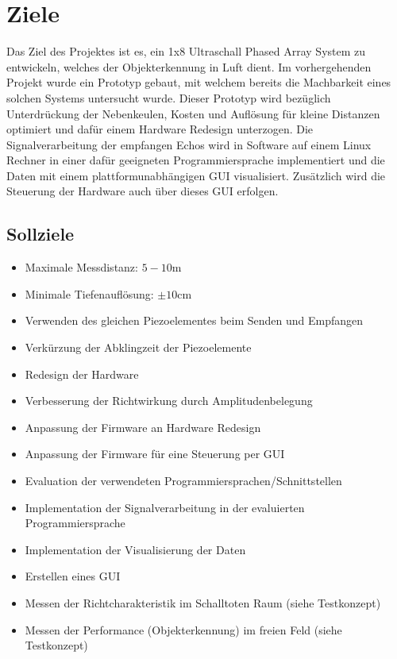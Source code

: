 \documentclass[10pt,a4paper,oneside]{99_fhnwreport}
\begin{document}
\clearpage

\section{Ziele}\label{sec:ziele}
Das Ziel des Projektes ist es, ein 1x8 Ultraschall Phased Array System zu entwickeln, welches der Objekterkennung in Luft dient. Im vorhergehenden Projekt wurde ein Prototyp gebaut, mit welchem bereits die Machbarkeit eines solchen Systems untersucht wurde. Dieser Prototyp wird bezüglich Unterdrückung der Nebenkeulen, Kosten und Auflösung für kleine Distanzen optimiert und dafür einem Hardware Redesign unterzogen. Die Signalverarbeitung der empfangen Echos wird in Software auf einem Linux Rechner in einer dafür geeigneten Programmiersprache implementiert und die Daten mit einem plattformunabhängigen GUI visualisiert. Zusätzlich wird die Steuerung der Hardware auch über dieses GUI erfolgen.

\subsection*{Sollziele}
\begin{itemize}
	\item Maximale Messdistanz: $5-10 \mathrm{m}$
	\item Minimale Tiefenauflösung: $\pm 10 \mathrm{cm}$
	\item Verwenden des gleichen Piezoelementes beim Senden und Empfangen
	\item Verkürzung der Abklingzeit der Piezoelemente
	\item Redesign der Hardware
	\item Verbesserung der Richtwirkung durch Amplitudenbelegung
	\item Anpassung der Firmware an Hardware Redesign
	\item Anpassung der Firmware für eine Steuerung per GUI
	\item Evaluation der verwendeten Programmiersprachen/Schnittstellen
	\item Implementation der Signalverarbeitung in der evaluierten Programmiersprache
	\item Implementation der Visualisierung der Daten
	\item Erstellen eines GUI
	\item Messen der Richtcharakteristik im Schalltoten Raum (siehe Testkonzept)
	\item Messen der Performance (Objekterkennung) im freien Feld (siehe Testkonzept)
\end{itemize}
\end{document}
